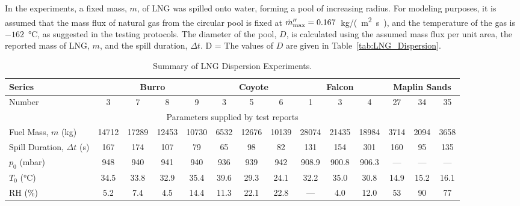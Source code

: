 In the experiments, a fixed mass, $m$, of LNG was spilled onto water, forming a pool of increasing radius. For modeling purposes, it is assumed that the mass flux of natural gas from the circular pool is fixed at $\dot{m}''_{\rm max}=0.167$~\unit{kg/(m^2.s)}, and the temperature of the gas is $-162$~\unit{\degreeCelsius}, as suggested in the testing protocols. The diameter of the pool, $D$, is calculated using the assumed mass flux per unit area, the reported mass of LNG, $m$, and the spill duration, $\Delta t$.
\be
   D = 
\ee
The values of $D$ are given in Table~\ref{tab:LNG_Dispersion}.

\begin{table}
\centering
\caption[Summary of LNG Dispersion Experiments]{Summary of LNG Dispersion Experiments.}
\begin{tabular}{|l|c|c|c|c|c|c|c|c|c|c|c|c|c|}
\hline
Series                         & \multicolumn{4}{|c|}{Burro}       & \multicolumn{3}{|c|}{Coyote}  & \multicolumn{3}{|c|}{Falcon}                  & \multicolumn{3}{|c|}{Maplin Sands}          \\ \hline
Number                         & 3      & 7      & 8      & 9      &  3     & 5      & 6           &  1          & 3           & 4                 &  27             & 34             & 35      \\ \hline \hline
\multicolumn{14}{|c|}{Parameters supplied by test reports} \\ \hline
Fuel Mass, $m$ (kg)            & 14712  & 17289  & 12453  & 10730  & 6532   & 12676  & 10139       & 28074       & 21435       & 18984             & 3714            & 2094           & 3658    \\ \hline
Spill Duration, $\Delta t$ (s) & 167    & 174    & 107    & 79     & 65     & 98     & 82          & 131         & 154         & 301               & 160             & 95             & 135     \\ \hline
$p_0$ (mbar)                   & 948    & 940    & 941    & 940    & 936    & 939    & 942         & 908.9       & 900.8       & 906.3             & ---             & ---            & ---     \\ \hline
$T_0$ (\unit{\degreeCelsius})              & 34.5   & 33.8   & 32.9   & 35.4   & 39.6   & 29.3   & 24.1        & 32.2        & 35.0        & 30.8              & 14.9            & 15.2           & 16.1    \\ \hline
RH (\%)                        & 5.2    & 7.4    & 4.5    & 14.4   & 11.3   & 22.1   & 22.8        & ---         & 4.0         & 12.0              & 53              & 90             & 77      \\ \hline

\end{tabular}
\end{table}

